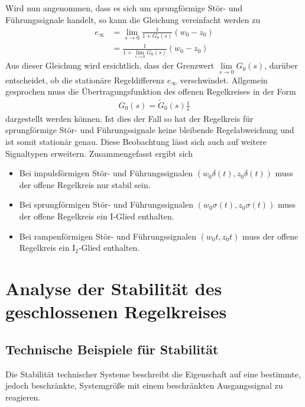 %
Wird nun angenommen, dass es sich um sprungförmige Stör- und Führungssignale handelt, so kann die Gleichung vereinfacht werden zu
%
\begin{equation*}
\begin{aligned}
%
e_{\infty}&=\lim\limits_{s\rightarrow 0}\frac{1}{1+G_{0}(s)}\left(w_{0}-z_{0}\right)\\
%
&=\frac{1}{1+\lim\limits_{s\rightarrow 0}G_{0}(s)}\left(w_{0}-z_{0}\right)
%
\end{aligned}
\end{equation*}  
%
Aus dieser Gleichung wird ersichtlich, dass der Grenzwert $\lim\limits_{s\rightarrow 0}G_{0}(s)$, darüber entscheidet, ob die stationäre Regeldifferenz $e_{\infty}$ verschwindet. Allgemein gesprochen muss die Übertragungsfunktion des offenen Regelkreises in der Form 
%
\begin{equation*}
\begin{aligned}
	G_{0}(s)=\tilde{G}_{0}(s)\frac{1}{s}
\end{aligned}
\end{equation*} 
%
dargestellt werden können. Ist dies der Fall so hat der Regelkreis für sprungförmige Stör- und Führungssignale keine bleibende Regelabweichung und ist somit stationär genau. Diese Beobachtung lässt sich auch auf weitere Signaltypen erweitern. Zusammengefasst ergibt sich 
%
\begin{itemize}
	\item Bei impulsförmigen Stör- und Führungssignalen $(w_{0}\delta(t),z_{0}\delta(t))$ muss der offene Regelkreis nur stabil sein.
	\item Bei sprungförmigen Stör- und Führungssignalen $(w_{0}\sigma(t),z_{0}\sigma(t))$ muss der offene Regelkreis ein I-Glied enthalten.
	\item Bei rampenförmigen Stör- und Führungssignalen $(w_{0}t,z_{0}t)$ muss der offene Regelkreis ein I$_{2}$-Glied enthalten.
\end{itemize}
%
\section{Analyse der Stabilität des geschlossenen Regelkreises}
\label{sec:stabilitaet}
%
\subsection{Technische Beispiele für Stabilität}
%
Die Stabilität technischer Systeme beschreibt die Eigenschaft auf eine bestimmte, jedoch beschränkte, Systemgröße mit einem beschränkten Ausgangssignal zu reagieren. 

